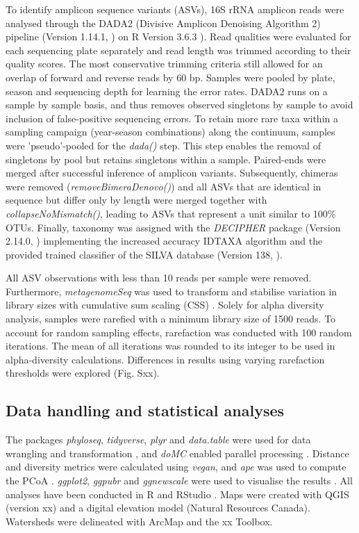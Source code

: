 \documentclass[12pt,a4paper]{article} %
\begin{document}
To identify amplicon sequence variants (ASVs), 16S rRNA amplicon reads were analysed through the DADA2 (Divisive Amplicon Denoising Algorithm 2) pipeline (Version 1.14.1, \citet{Callahan2017}) on R Version 3.6.3 \citep{RCoreTeam2017}). Read qualities were evaluated for each sequencing plate separately and read length was trimmed according to their quality scores. The most conservative trimming criteria still allowed for an overlap of forward and reverse reads by 60 bp. Samples were pooled by plate, season and sequencing depth for learning the error rates. DADA2 runs on a sample by sample basis, and thus removes observed singletons by sample to avoid inclusion of false-positive sequencing errors. To retain more rare taxa within a sampling campaign (year-season combinations) along the continuum, samples were 'pseudo'-pooled for the \textit{dada()} step.  This step enables the removal of singletons by pool but retains singletons within a sample. Paired-ends were merged after successful inference of amplicon variants. Subsequently, chimeras were removed (\textit{removeBimeraDenovo()}) and all ASVs that are identical in sequence but differ only by length were merged together with \textit{collapseNoMismatch()}, leading to ASVs that represent a unit similar to 100\% OTUs. Finally, taxonomy was assigned with the \textit{DECIPHER} package (Version 2.14.0, \citet{Wright2016}) implementing the increased accuracy IDTAXA algorithm \citep{Murali2018} and the provided trained classifier of the SILVA database (Version 138, \citet{Pruesse2007}).

All ASV observations with less than 10 reads per sample were removed. Furthermore, \textit{metagenomeSeq} was used to transform and stabilise variation in library sizes with cumulative sum scaling (CSS) \citep{Paulson2013}. Solely for alpha diversity analysis, samples were rarefied with a minimum library size of 1500 reads. To account for random sampling effects, rarefaction was conducted with 100 random iterations. The mean of all iterations was rounded to its integer to be used in alpha-diversity calculations. Differences in results using varying rarefaction thresholds were explored (Fig. Sxx).

\subsection*{Data handling and statistical analyses}

The packages \textit{phyloseq}, \textit{tidyverse}, \textit{plyr} and \textit{data.table} were used for data wrangling and transformation \citep{McMurdie2013,Wickham2019, Wickham2011, Dowle2019}, and \textit{doMC} enabled parallel processing \citep{Analytics2019}. Distance and diversity metrics were calculated using \textit{vegan}, and \textit{ape} was used to compute the PCoA \citep{Oksanen2017, Paradis2018}. \textit{ggplot2}, \textit{ggpubr} and \textit{ggnewscale} were used to visualise the results \citep{Wickham2016, Kassambara2018, Campitelli2020}. All analyses have been conducted in R \citep{RCoreTeam2017} and RStudio \citep{RStudioTeam2016}. Maps were created with QGIS (version xx) and a digital elevation model (Natural Resources Canada). Watersheds were delineated with ArcMap and the xx Toolbox. 
\end{document}
